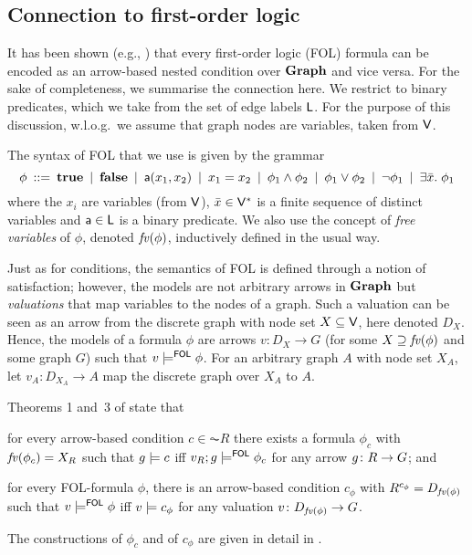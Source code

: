 \subsection{Connection to first-order logic}

It has been shown (e.g., \cite{Rensink-FOL,Habel-FOL}) that every first-order logic (FOL) formula can be encoded as an arrow-based nested condition over $\mathbf{Graph}$ and vice versa. For the sake of completeness, we summarise the connection here. We restrict to binary predicates, which we take from the set of edge labels $\mathsf{L}$. For the purpose of this discussion, w.l.o.g.\ we assume that graph nodes are variables, taken from $\mathsf{V}$.

The syntax of FOL that we use is given by the grammar
%
\[ \phi \:::=\: \textbf{true}
        \:\mid\: \textbf{false}
		\:\mid\: \mathsf{a}(x_1,x_2)
        \:\mid\: x_1=x_2
		\:\mid\: \phi_1\wedge \phi_2
		\:\mid\: \phi_1\vee \phi_2
		\:\mid\: \neg\phi_1
		\:\mid\: \exists \bar x.\; \phi_1 
		\]
where the $x_i$ are variables (from $\mathsf{V}$), $\bar x\in \mathsf{V}^*$ is a finite sequence of distinct variables and $\mathsf{a} \in \mathsf{L}$ is a binary predicate. We also use the concept of \emph{free variables} of $\phi$, denoted $\mathit{fv}(\phi)$, inductively defined in the usual way.

Just as for conditions, the semantics of FOL is defined through a notion of satisfaction; however, the models are not arbitrary arrows in $\mathbf{Graph}$ but \emph{valuations} that map variables to the nodes of a graph. Such a valuation can be seen as an arrow from the discrete graph with node set $X\subseteq \mathsf{V}$, here denoted $D_X$. Hence, the models of a formula $\phi$ are arrows $v:D_X\to G$ (for some $X\supseteq \mathit{fv}(\phi)$ and some graph $G$) such that $v\models^{\mathsf{FOL}} \phi$. For an arbitrary graph $A$ with node set $X_A$, let $v_A:D_{X_A}\to A$ map the discrete graph over $X_A$ to $A$.

Theorems 1 and~3 of \cite{Rensink-FOL} state that
\begin{enumerate*}[label=\emph{(\roman*)}]
\item for every arrow-based condition $c\in \AC R$ there exists a formula $\phi_c$ with $\mathit{fv}(\phi_c)=X_R$ such that $g\models c$ iff $v_R;g\models^{\mathsf{FOL}} \phi_c$ for any arrow $g\colon R\rightarrow G$; and

\item for every FOL-formula $\phi$, there is an arrow-based condition $c_\phi$ with $R^{c_\phi}=D_{\mathit{fv}(\phi)}$ such that $v\models^{\mathsf{FOL}} \phi$ iff $v\models c_\phi$ for any valuation $v\colon D_{\mathit{fv}(\phi)}\rightarrow G$.
\end{enumerate*}
The constructions of $\phi_c$ and of $c_\phi$ are given in detail in \cite{Rensink-FOL}.
